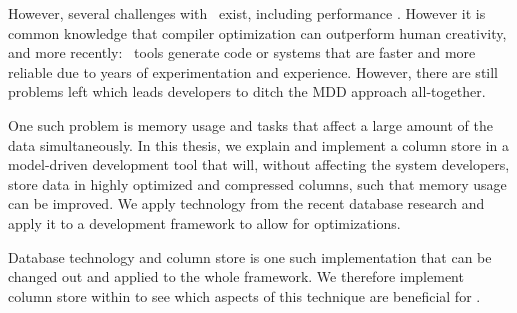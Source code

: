 


However, several challenges with \mdd~exist, including performance \cite{Selic2003-qa}. However it is common knowledge that compiler optimization can outperform human creativity, and more recently: \mdd~tools generate code or systems that are faster and more reliable due to years of experimentation and experience. However, there are still problems left which leads developers to ditch the MDD approach all-together.

One such problem is memory usage and tasks that affect a large amount of the data simultaneously. In this thesis, we explain and implement a column store in a model-driven development tool that will, without affecting the system developers, store data in highly optimized and compressed columns, such that memory usage can be improved. We apply technology from the recent database research and apply it to a development framework to allow for optimizations.


Database technology and column store is one such implementation that can be changed out and applied to the whole framework. We therefore implement column store within \gap to see which aspects of this technique are beneficial for \mdd.

